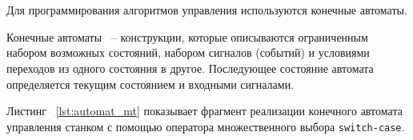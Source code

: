 \begin{comment}
void writeOutputs() \{ & \textcolor{exComm}{// Запись выходов} \\
\quad Servo[0].IO[0].DataOut[0] = mt.PultOut.PultLed[0]; & \textcolor{exComm}{// } \\
\quad Servo[0].IO[0].DataOut[1] = mt.PultOut.PultLed[1]; & \textcolor{exComm}{// } \\
\quad Servo[0].IO[0].DataOut[2] = mt.PultOut.PultLed[2]; & \textcolor{exComm}{// } \\
\quad Servo[0].IO[1].DataOut[0] = mt.OUT.Outputs[0]; & \textcolor{exComm}{// } \\
\} &  \\
\vdots &  \\
\end{tabular}

\end{pExample}  
\end{comment}









\section{}

Для программирования алгоритмов управления используются конечные автоматы. 

Конечные автоматы ~-- конструкции, которые описываются ограниченным набором возможных состояний, набором сигналов (событий) и условиями переходов из одного состояния в другое. Последующее состояние автомата определяется текущим состоянием и входными сигналами.

Листинг ~\ref{lst:automat_mt} показывает фрагмент реализации конечного автомата управления станком с помощью оператора множественного выбора \texttt{switch-case}. \killoverfullbefore \BL


